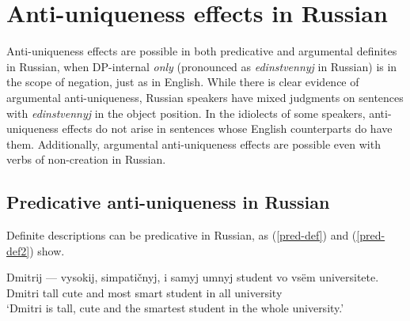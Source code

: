 \section{Anti-uniqueness effects in Russian \label{sec:anti-uniqueness-russian}}
Anti-uniqueness effects are possible in both predicative and argumental definites in Russian, when DP-internal \textit{only} (pronounced as \textit{edinstvennyj} in Russian) is in the scope of negation, just as in English. While there is clear evidence of argumental anti-uniqueness, Russian speakers have mixed judgments on sentences with \textit{edinstvennyj} in the object position. In the idiolects of some speakers, anti-uniqueness effects do not arise in sentences whose English counterparts do have them. Additionally, argumental anti-uniqueness effects are possible even with verbs of non-creation in Russian.

\subsection{Predicative anti-uniqueness in Russian}
Definite descriptions can be predicative in Russian, as (\ref{pred-def}) and (\ref{pred-def2}) show.

\begin{exe}
	\ex \label{pred-def} \gll Dmitrij --- vysokij, simpati\v{c}nyj, i samyj umnyj student vo vs\"{e}m universitete.\\
	Dmitri {} tall cute and most smart student in all university\\
	\glt `Dmitri is tall, cute and the smartest student in the whole university.'

\end{exe}

